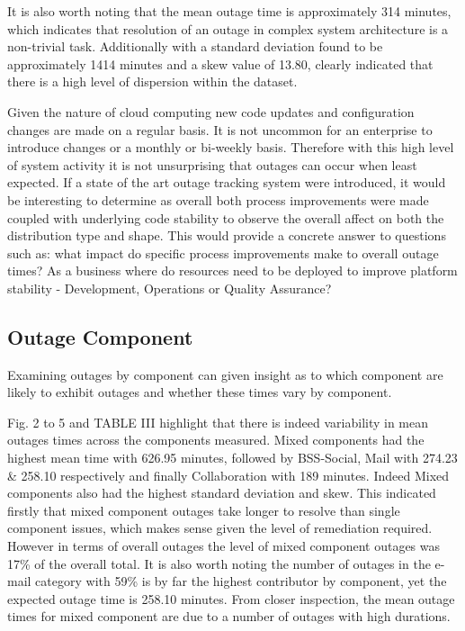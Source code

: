 \documentclass[conference]{IEEEtran}
\begin{document}
It is also worth noting that the mean outage time is approximately 314 minutes, which indicates that resolution of an outage in complex system architecture is a non-trivial task. Additionally with a standard deviation found to be approximately 1414 minutes and a skew value of 13.80, clearly indicated that there is a high level of dispersion within the dataset. \par

Given the nature of cloud computing new code updates and configuration changes are made on a regular basis. It is not uncommon for an enterprise to introduce changes or a monthly or bi-weekly basis. Therefore with this high level of system activity it is not unsurprising that outages can occur when least expected. If a state of the art outage tracking system were introduced, it would be interesting to determine as overall both process improvements were made coupled with underlying code stability to observe the overall affect on both the distribution type and shape. This would provide a concrete answer to questions such as: what impact do specific process improvements make to overall outage times? As a business where do resources need to be deployed to improve platform stability - Development, Operations or Quality Assurance? \par

\subsection{Outage Component}

Examining outages by component can given insight as to which component are likely to exhibit outages and whether these times vary by component. \par

Fig. 2 to 5 and TABLE III highlight that there is indeed variability in mean outages times across the components measured. Mixed components had the highest mean time with 626.95 minutes, followed by BSS-Social, Mail with 274.23 \& 258.10 respectively and finally Collaboration with 189 minutes. Indeed Mixed components also had the highest standard deviation and skew. This indicated firstly that mixed component outages take longer to resolve than single component issues, which makes sense given the level of remediation required. However in terms of overall outages the level of mixed component outages was 17\% of the overall total. It is also worth noting the number of outages in the e-mail category with 59\% is by far the highest contributor by component, yet the expected outage time is 258.10 minutes.  From closer inspection, the mean outage times for mixed component are due to a number of outages with high durations. \par
\end{document}
